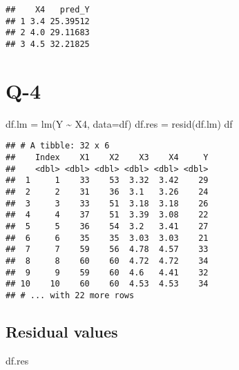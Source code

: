 \documentclass[
]{article}
\newenvironment{Shaded}{\begin{snugshade}}{\end{snugshade}}
\newcommand{\AttributeTok}[1]{\textcolor[rgb]{0.77,0.63,0.00}{#1}}
\newcommand{\FunctionTok}[1]{\textcolor[rgb]{0.00,0.00,0.00}{#1}}
\newcommand{\NormalTok}[1]{#1}
\newcommand{\OtherTok}[1]{\textcolor[rgb]{0.56,0.35,0.01}{#1}}
\newcommand{\SpecialCharTok}[1]{\textcolor[rgb]{0.00,0.00,0.00}{#1}}
\begin{document}
\begin{Shaded}
\end{Shaded}

\begin{verbatim}
##    X4   pred_Y
## 1 3.4 25.39512
## 2 4.0 29.11683
## 3 4.5 32.21825
\end{verbatim}

\hypertarget{q-4}{%
\section{Q-4}\label{q-4}}

\begin{Shaded}
\begin{Highlighting}[]
\NormalTok{df.lm }\OtherTok{=} \FunctionTok{lm}\NormalTok{(Y }\SpecialCharTok{\textasciitilde{}}\NormalTok{ X4, }\AttributeTok{data=}\NormalTok{df) }
\NormalTok{df.res }\OtherTok{=} \FunctionTok{resid}\NormalTok{(df.lm)}
\NormalTok{df}
\end{Highlighting}
\end{Shaded}

\begin{verbatim}
## # A tibble: 32 x 6
##    Index    X1    X2    X3    X4     Y
##    <dbl> <dbl> <dbl> <dbl> <dbl> <dbl>
##  1     1    33    53  3.32  3.42    29
##  2     2    31    36  3.1   3.26    24
##  3     3    33    51  3.18  3.18    26
##  4     4    37    51  3.39  3.08    22
##  5     5    36    54  3.2   3.41    27
##  6     6    35    35  3.03  3.03    21
##  7     7    59    56  4.78  4.57    33
##  8     8    60    60  4.72  4.72    34
##  9     9    59    60  4.6   4.41    32
## 10    10    60    60  4.53  4.53    34
## # ... with 22 more rows
\end{verbatim}

\hypertarget{residual-values}{%
\subsection{Residual values}\label{residual-values}}

\begin{Shaded}
\begin{Highlighting}[]
\NormalTok{df.res}
\end{Highlighting}
\end{Shaded}
\end{document}
